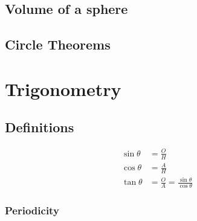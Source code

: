 \documentclass[fleqn,a4paper,11pt]{article}
\begin{document}
    \subsection{Volume of a sphere}

    \subsection{Circle Theorems}

    \section{Trigonometry}

    \subsection{Definitions} \label{sec_trig_definitions}


    \begin{align}
    \sin \theta &= \frac OH \\
    \cos \theta &= \frac AH \\
    \tan \theta &= \frac OA = \frac{\sin \theta}{\cos \theta}
    \end{align}

    \subsubsection{Periodicity} \label{sec_trig_periodic}

\end{document}
